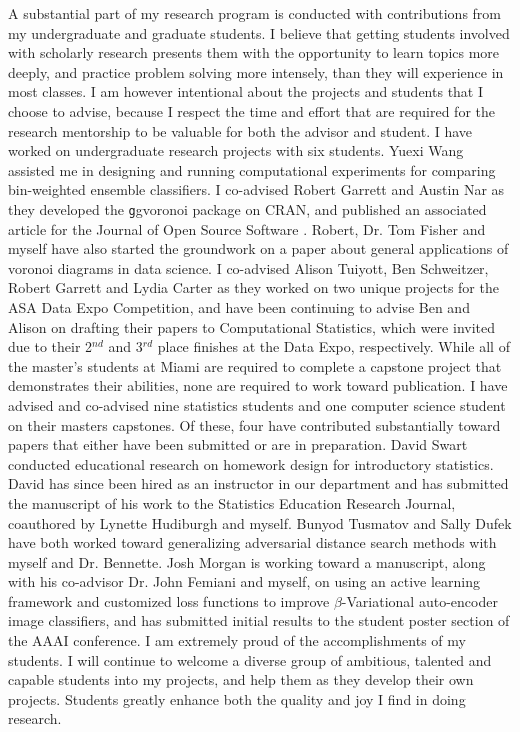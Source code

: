 \documentclass[letterpaper,12pt]{article}\usepackage[]{graphicx}\usepackage[]{color}
\begin{document}
A substantial part of my research program is conducted with contributions from my undergraduate and graduate students. I believe that getting students involved with scholarly research presents them with the opportunity to learn topics more deeply, and practice problem solving more intensely, than they will experience in most classes. I am however intentional about the projects and students that I choose to advise, because I respect the time and effort that are required for the research mentorship to be valuable for both the advisor and student. I have worked on undergraduate research projects with six students. Yuexi Wang assisted me in designing and running computational experiments for comparing bin-weighted ensemble classifiers. I co-advised Robert Garrett and Austin Nar as they developed the {\texttt ggvoronoi} package on CRAN, and published an associated article for the Journal of Open Source Software \citep{garrett2018ggvoronoi}. Robert, Dr. Tom Fisher and myself have also started the groundwork on a paper about general applications of voronoi diagrams in data science. I co-advised Alison Tuiyott, Ben Schweitzer, Robert Garrett and Lydia Carter as they worked on two unique projects for the ASA Data Expo Competition, and have been continuing to advise Ben and Alison on drafting their papers to Computational Statistics, which were invited due to their 2$^{nd}$ and 3$^{rd}$ place finishes at the Data Expo, respectively. While all of the master's students at Miami are required to complete a capstone project that demonstrates their abilities, none are required to work toward publication. I have advised and co-advised nine statistics students and one computer science student on their masters capstones. Of these, four have contributed substantially toward papers that either have been submitted or are in preparation. David Swart conducted educational research on homework design for introductory statistics. David has since been hired as an instructor in our department and has submitted the manuscript of his work to the Statistics Education Research Journal, coauthored by Lynette Hudiburgh and myself. Bunyod Tusmatov and Sally Dufek have both worked toward generalizing adversarial distance search methods with myself and Dr. Bennette. Josh Morgan is working toward a manuscript, along with his co-advisor Dr. John Femiani and myself, on using an active learning framework and customized loss functions to improve $\beta$-Variational auto-encoder image classifiers, and has submitted initial results to the student poster section of the AAAI conference. I am extremely proud of the accomplishments of my students. I will continue to welcome a diverse group of ambitious, talented and capable students into my projects, and help them as they develop their own projects. Students greatly enhance both the quality and joy I find in doing research. 
\end{document}
